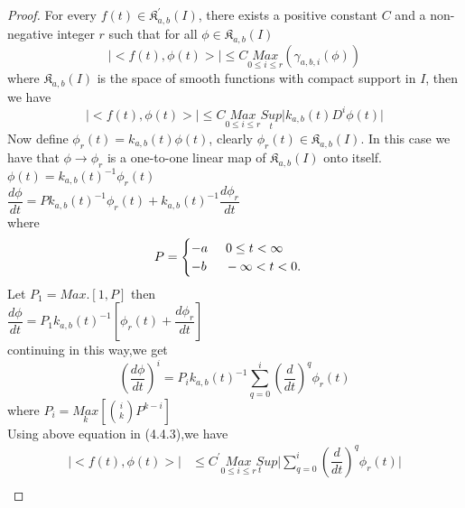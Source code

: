 \begin{proof}

 For every $ f(t)\in \mathfrak{K}_{a,b}^{'}(I) $, there exists a positive constant $C$ and a non-negative integer $r$ such that for all $\phi\in \mathfrak{K}_{a,b}(I)$\\
\begin{equation}
\vert<f(t),\phi(t)>\vert \leq C\underset{0\leq i\leq r}{Max}(\gamma_{a,b,i}(\phi))
\end{equation}
where $\mathfrak{K}_{a,b}(I)$ is the space of smooth functions with compact support in $I$, then we have \\
\begin{equation}
\vert<f(t),\phi(t)>\vert \leq C\underset{0\leq i\leq r}{Max}\underset{t}{Sup}\vert k_{a,b}(t)D^{i}\phi(t)\vert
\end{equation}
Now define $\phi_{r}(t)=k_{a,b}(t)\phi(t)$,
clearly $\phi_{r}(t)\in \mathfrak{K}_{a,b}(I)$. In this case we have that $\phi\rightarrow\phi_{r}$ is a one-to-one linear map of $\mathfrak{K}_{a,b}(I)$ onto itself. $ \phi(t)=k_{a,b}(t)^{-1}\phi_{r}(t)$\\
$ \dfrac{d\phi}{dt}= P k_{a,b}(t)^{-1}\phi_{r}(t)+k_{a,b}(t)^{-1}\dfrac{d\phi_{r}}{dt}$\\ 
where \begin{align*}
  P = \begin{cases}
  -a\hspace{0.5cm}  0\leq t<\infty \\
 -b\hspace{0.5cm}  -\infty<t<0.
  \end{cases}
 \end{align*}
Let $P_{1}= Max.[1,P]$ then\\
$\dfrac{d\phi}{dt}= P_{1} k_{a,b}(t)^{-1}[\phi_{r}(t)+\dfrac{d\phi_{r}}{dt}]$\\
continuing in this way,we get\\
\begin{equation}
(\dfrac{d\phi}{dt})^{i}= P_{i}k_{a,b}(t)^{-1}\sum_{q=0}^{i}(\dfrac{d}{dt})^{q}\phi_{r}(t)
\end{equation} 
where $P_{i}= \underset{k}{Max}[\binom{i}{k}P^{k-i}]$\\
Using above equation in (4.4.3),we have
\begin{align*}
\vert<f(t),\phi(t)>\vert &\leq C^{'}\underset{0\leq i\leq r}{Max}\underset{t}Sup\vert\sum_{q=0}^{i}(\dfrac{d}{dt})^{q}\phi_{r}(t)\vert
\end{align*}
\begin{align}

\end{align}
\end{proof}
